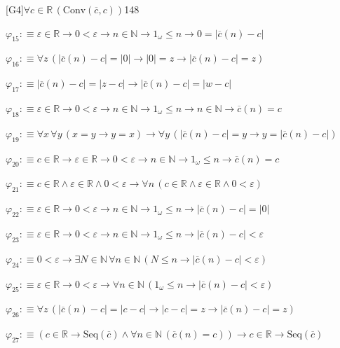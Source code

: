 \begin{fullproof}{[G4]}{$\forall c \in \mathbb{R}\,(\mathrm{Conv}(\overline{c},c))$}{148}
\begin{abbrevlist}
\item $\varphi_{15} :\equiv \varepsilon \in \mathbb{R} \to 0 < \varepsilon \to n \in \mathbb{N} \to 1_{\omega} \leq n \to 0 = \lvert \overline{c}(n) - c \rvert$
\item $\varphi_{16} :\equiv \forall z\,(\lvert \overline{c}(n) - c \rvert = \lvert 0 \rvert \to \lvert 0 \rvert = z \to \lvert \overline{c}(n) - c \rvert = z)$
\item $\varphi_{17} :\equiv \lvert \overline{c}(n) - c \rvert = \lvert z - c \rvert \to \lvert \overline{c}(n) - c \rvert = \lvert w - c \rvert$
\item $\varphi_{18} :\equiv \varepsilon \in \mathbb{R} \to 0 < \varepsilon \to n \in \mathbb{N} \to 1_{\omega} \leq n \to n \in \mathbb{N} \to \overline{c}(n) = c$
\item $\varphi_{19} :\equiv \forall x\,\forall y\,(x = y \to y = x) \to \forall y\,(\lvert \overline{c}(n) - c \rvert = y \to y = \lvert \overline{c}(n) - c \rvert)$
\item $\varphi_{20} :\equiv c \in \mathbb{R} \to \varepsilon \in \mathbb{R} \to 0 < \varepsilon \to n \in \mathbb{N} \to 1_{\omega} \leq n \to \overline{c}(n) = c$
\item $\varphi_{21} :\equiv c \in \mathbb{R} \land \varepsilon \in \mathbb{R} \land 0 < \varepsilon \to \forall n\,(c \in \mathbb{R} \land \varepsilon \in \mathbb{R} \land 0 < \varepsilon)$
\item $\varphi_{22} :\equiv \varepsilon \in \mathbb{R} \to 0 < \varepsilon \to n \in \mathbb{N} \to 1_{\omega} \leq n \to \lvert \overline{c}(n) - c \rvert = \lvert 0 \rvert$
\item $\varphi_{23} :\equiv \varepsilon \in \mathbb{R} \to 0 < \varepsilon \to n \in \mathbb{N} \to 1_{\omega} \leq n \to \lvert \overline{c}(n) - c \rvert < \varepsilon$
\item $\varphi_{24} :\equiv 0 < \varepsilon \to \exists N \in \mathbb{N}\,\forall n \in \mathbb{N}\,(N \leq n \to \lvert \overline{c}(n) - c \rvert < \varepsilon)$
\item $\varphi_{25} :\equiv \varepsilon \in \mathbb{R} \to 0 < \varepsilon \to \forall n \in \mathbb{N}\,(1_{\omega} \leq n \to \lvert \overline{c}(n) - c \rvert < \varepsilon)$
\item $\varphi_{26} :\equiv \forall z\,(\lvert \overline{c}(n) - c \rvert = \lvert c - c \rvert \to \lvert c - c \rvert = z \to \lvert \overline{c}(n) - c \rvert = z)$
\item $\varphi_{27} :\equiv (c \in \mathbb{R} \to \mathrm{Seq}(\overline{c}) \land \forall n \in \mathbb{N}\,(\overline{c}(n) = c)) \to c \in \mathbb{R} \to \mathrm{Seq}(\overline{c})$

\end{abbrevlist}
\end{fullproof}
